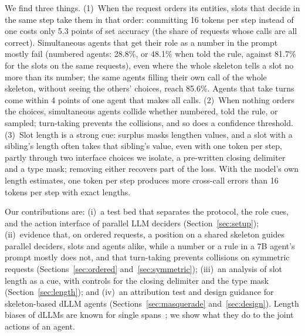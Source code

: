 We find three things. (1)~When the request orders its entities, slots that decide in the same step take them in that order: committing 16 tokens per step instead of one costs \dream only 5.3 points of set accuracy (the share of requests whose calls are all correct). Simultaneous agents that get their role as a number in the prompt mostly fail (numbered \dream agents: 28.8\%, or 48.1\% when told the rule, against 81.7\% for the slots on the same requests), even where the whole skeleton tells a slot no more than its number; the same agents filling their own call of the whole skeleton, without seeing the others' choices, reach 85.6\%. Agents that take turns come within 4 points of one agent that makes all calls. (2)~When nothing orders the choices, simultaneous agents collide whether numbered, told the rule, or sampled; turn-taking prevents the collisions, and so does a confidence threshold. (3)~Slot length is a strong cue: surplus masks lengthen values, and a slot with a sibling's length often takes that sibling's value, even with one token per step, partly through two interface choices we isolate, a pre-written closing delimiter and a type mask; removing either recovers part of the loss. With the model's own length estimates, one token per step produces more cross-call errors than 16 tokens per step with exact lengths.

Our contributions are:
(i)~a test bed that separates the protocol, the role cues, and the action interface of parallel LLM deciders (Section~\ref{sec:setup});
(ii)~evidence that, on ordered requests, a position on a shared skeleton guides parallel deciders, slots and \dream agents alike, while a number or a rule in a 7B agent's prompt mostly does not, and that turn-taking prevents collisions on symmetric requests (Sections~\ref{sec:ordered} and~\ref{sec:symmetric});
(iii)~an analysis of slot length as a cue, with controls for the closing delimiter and the type mask (Section~\ref{sec:length}); and
(iv)~an attribution test and design guidance for skeleton-based dLLM agents (Sections~\ref{sec:masquerade} and~\ref{sec:design}).
Length biases of dLLMs are known for single spans~\cite{wu2026dreamon,han2026dia,liu2026cal}; we show what they do to the joint actions of an agent.
